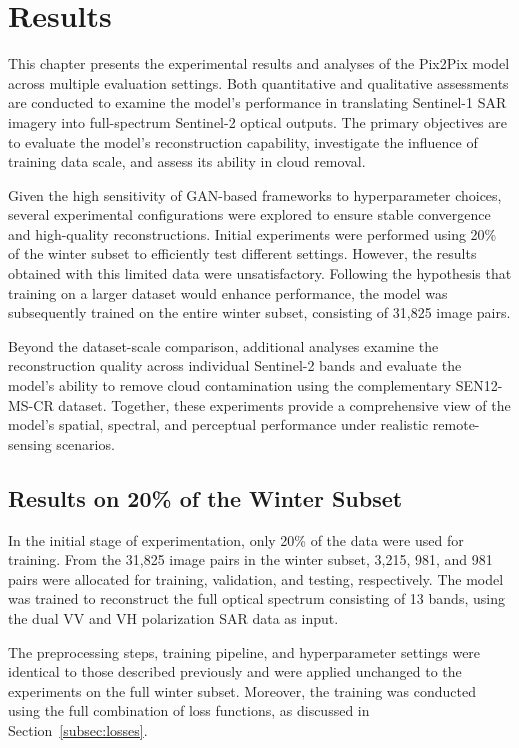 \chapter{Results}
This chapter presents the experimental results and analyses of the Pix2Pix model across multiple evaluation settings. Both quantitative and qualitative assessments are conducted to examine the model’s performance in translating Sentinel-1 SAR imagery into full-spectrum Sentinel-2 optical outputs. The primary objectives are to evaluate the model’s reconstruction capability, investigate the influence of training data scale, and assess its ability in cloud removal.

Given the high sensitivity of GAN-based frameworks to hyperparameter choices, several experimental configurations were explored to ensure stable convergence and high-quality reconstructions. Initial experiments were performed using 20\% of the winter subset to efficiently test different settings. However, the results obtained with this limited data were unsatisfactory. Following the hypothesis that training on a larger dataset would enhance performance, the model was subsequently trained on the entire winter subset, consisting of 31,825 image pairs.

Beyond the dataset-scale comparison, additional analyses examine the reconstruction quality across individual Sentinel-2 bands and evaluate the model’s ability to remove cloud contamination using the complementary SEN12-MS-CR dataset. Together, these experiments provide a comprehensive view of the model’s spatial, spectral, and perceptual performance under realistic remote-sensing scenarios.

\section{Results on 20\% of the Winter Subset}
In the initial stage of experimentation, only 20\% of the data were used for training. From the 31,825 image pairs in the winter subset, 3,215, 981, and 981 pairs were allocated for training, validation, and testing, respectively. The model was trained to reconstruct the full optical spectrum consisting of 13 bands, using the dual VV and VH polarization SAR data as input.

The preprocessing steps, training pipeline, and hyperparameter settings were identical to those described previously and were applied unchanged to the experiments on the full winter subset. Moreover, the training was conducted using the full combination of loss functions, as discussed in Section~\ref{subsec:losses}.

